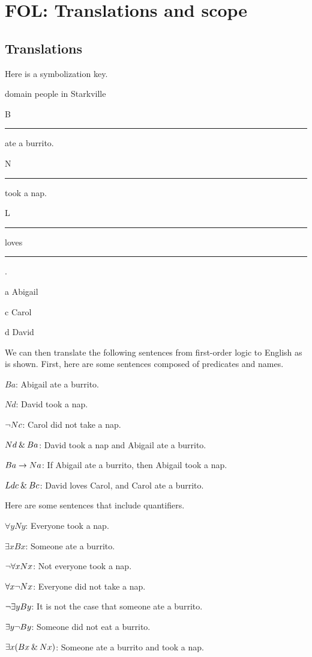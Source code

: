 \graphicspath{{figures--proofs/}}

\chapter{FOL: Translations and scope}\label{FOL-basics}

\section{Translations}

Here is a symbolization key.

\begin{ekey}
	\item[\textrm{domain}] people in Starkville
	\item[B] \rule{1cm}{0.15mm} ate a burrito.
	\item[N] \rule{1cm}{0.15mm} took a nap.
	\item[L] \rule{1cm}{0.15mm} loves \rule{1cm}{0.15mm} .
	\item[a] Abigail
	\item[c] Carol
	\item[d] David
\end{ekey}

\noindent We can then translate the following sentences from first-order logic to English as is shown. First, here are some sentences composed of predicates and names.

\begin{ebullet}
	\item[]$Ba $: Abigail ate a burrito.\smallskip
	\item[]$Nd $: David took a nap.\smallskip
	\item[]${\neg} Nc$: Carol did not take a nap.\smallskip
	\item[]$Nd \mathbin{\&} Ba $: David took a nap and Abigail ate a burrito.\smallskip
	\item[]$Ba \rightarrow Na$: If Abigail ate a burrito, then Abigail took a nap.\smallskip
	\item[]$Ldc \mathbin{\&} Bc$: David loves Carol, and Carol ate a burrito.
\end{ebullet}

\noindent Here are some sentences that include quantifiers.

\begin{ebullet}
	\item[] $\forall y Ny$: Everyone took a nap.\smallskip
	\item[] $\exists x Bx$: Someone ate a burrito.\smallskip
	\item[] ${\neg}\forall xNx$: Not everyone took a nap.\smallskip
	\item[]$\forall x {\neg} Nx$: Everyone did not take a nap.\smallskip
	\item[]${\neg}\exists yBy$: It is not the case that someone ate a burrito.\smallskip
	\item[]$\exists y {\neg} By$: Someone did not eat a burrito.\smallskip
	\item[]$\exists x(Bx \mathbin{\&} Nx)$: Someone ate a burrito and took a nap.\smallskip
\end{ebullet}
	
